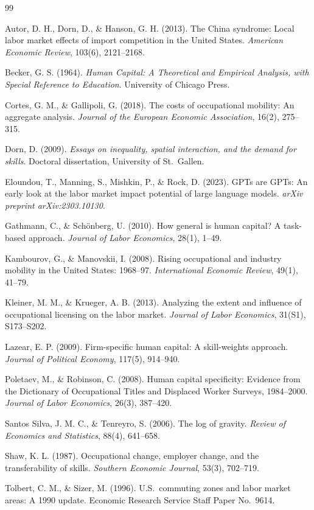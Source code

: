 \documentclass[12pt]{article}
\begin{document}
\begin{thebibliography}{99}

Autor, D. H., Dorn, D., \& Hanson, G. H. (2013).
The China syndrome: Local labor market effects of import competition in the United States.
\textit{American Economic Review}, 103(6), 2121--2168.

Becker, G. S. (1964).
\textit{Human Capital: A Theoretical and Empirical Analysis, with Special Reference to Education}.
University of Chicago Press.

Cortes, G. M., \& Gallipoli, G. (2018).
The costs of occupational mobility: An aggregate analysis.
\textit{Journal of the European Economic Association}, 16(2), 275--315.

Dorn, D. (2009).
\textit{Essays on inequality, spatial interaction, and the demand for skills}.
Doctoral dissertation, University of St.\ Gallen.

Eloundou, T., Manning, S., Mishkin, P., \& Rock, D. (2023).
GPTs are GPTs: An early look at the labor market impact potential of large language models.
\textit{arXiv preprint arXiv:2303.10130}.

Gathmann, C., \& Sch\"{o}nberg, U. (2010).
How general is human capital? A task-based approach.
\textit{Journal of Labor Economics}, 28(1), 1--49.

Kambourov, G., \& Manovskii, I. (2008).
Rising occupational and industry mobility in the United States: 1968--97.
\textit{International Economic Review}, 49(1), 41--79.

Kleiner, M. M., \& Krueger, A. B. (2013).
Analyzing the extent and influence of occupational licensing on the labor market.
\textit{Journal of Labor Economics}, 31(S1), S173--S202.

Lazear, E. P. (2009).
Firm-specific human capital: A skill-weights approach.
\textit{Journal of Political Economy}, 117(5), 914--940.

Poletaev, M., \& Robinson, C. (2008).
Human capital specificity: Evidence from the Dictionary of Occupational Titles and Displaced Worker Surveys, 1984--2000.
\textit{Journal of Labor Economics}, 26(3), 387--420.

Santos Silva, J. M. C., \& Tenreyro, S. (2006).
The log of gravity.
\textit{Review of Economics and Statistics}, 88(4), 641--658.

Shaw, K. L. (1987).
Occupational change, employer change, and the transferability of skills.
\textit{Southern Economic Journal}, 53(3), 702--719.

Tolbert, C. M., \& Sizer, M. (1996).
U.S.\ commuting zones and labor market areas: A 1990 update.
Economic Research Service Staff Paper No.\ 9614.

\end{thebibliography}
\end{document}
